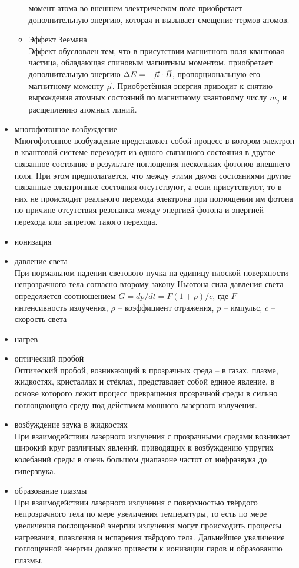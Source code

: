 \begin{itemize}
\begin{itemize}
				момент атома во внешнем электрическом поле приобретает 
				дополнительную энергию, которая и вызывает смещение 
				термов атомов.
			\item Эффект Зеемана \\
				Эффект обусловлен тем, что в присутствии магнитного поля 
				квантовая частица, обладающая спиновым магнитным моментом, 
				приобретает дополнительную энергию 
				\( \Delta E = -\vec{\mu}\cdot\vec{B} \), пропорциональную его 
				магнитному моменту \( \vec{\mu} \). Приобретённая энергия 
				приводит к снятию вырождения атомных состояний по магнитному 
				квантовому числу \( m_j \) и расщеплению атомных линий.
		\end{itemize}
	\item многофотонное возбуждение \\
		Многофотонное возбуждение представляет собой процесс в котором 
		электрон в квантовой системе переходит из одного связанного состояния 
		в другое связанное состояние в результате поглощения нескольких 
		фотонов внешнего поля. При этом предполагается, что между этими двумя 
		состояниями другие связанные электронные состояния отсутствуют, а 
		если присутствуют, то в них не происходит реального перехода электрона 
		при поглощении им фотона по причине отсутствия резонанса между 
		энергией фотона и энергией перехода или запретом такого перехода.  
	\item ионизация
	\item давление света \\
		При нормальном падении светового пучка на единицу плоской поверхности 
		непрозрачного тела согласно второму закону Ньютона сила давления 
		света определяется соотношением \( G = dp/dt = F(1+\rho)/c \), где 
		\( F \) -- интенсивность излучения, \( \rho \) -- коэффициент 
		отражения, \( p \) -- импульс, \( c \) -- скорость света
	\item нагрев
	\item оптический пробой \\
		Оптический пробой, возникающий в прозрачных среда -- в газах, плазме, 
		жидкостях, кристаллах и стёклах, представляет собой единое явление, в 
		основе которого лежит процесс превращения прозрачной среды в сильно 
		поглощающую среду под действием мощного лазерного излучения. 
	\item возбуждение звука в жидкостях \\
		При взаимодействии лазерного излучения с прозрачными средами возникает 
		широкий круг различных явлений, приводящих к возбуждению упругих 
		колебаний среды в очень большом диапазоне частот от инфразвука до 
		гиперзвука.
	\item образование плазмы \\
		При взаимодействии лазерного излучения с поверхностью твёрдого 
		непрозрачного тела по мере увеличения температуры, то есть по мере 
		увеличения поглощенной энергии излучения могут происходить процессы 
		нагревания, плавления и испарения твёрдого тела. Дальнейшее увеличение 
		поглощенной энергии должно привести к ионизации паров и образованию 
		плазмы.
\end{itemize}